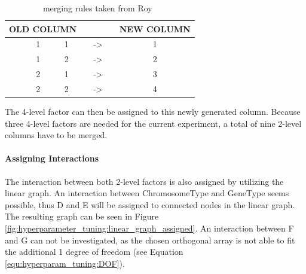 \begin{table}[ht]
	\centering
	\begin{tabular}{ |ccccccc|  }
		\hline
		\multicolumn{3}{|c}{ OLD COLUMN } & & & & NEW COLUMN \\
		\hline
		& 1 & 1 & & -> & & 1\\
		& 1 & 2 & & -> & & 2\\
		& 2 & 1 & & -> & & 3\\
		& 2 & 2 & & -> & & 4\\
		\hline
	\end{tabular}
	\caption{merging rules taken from Roy~\cite{roy_primer_1990}}
	\label{tab:hyperparameter_tuning:merging_rules}
\end{table}

The 4-level factor can then be assigned to this newly generated column. Because three 4-level factors are needed for the current experiment, a total of nine 2-level columns have to be merged.

\paragraph{Assigning Interactions}
The interaction between both 2-level factors is also assigned by utilizing the linear graph. An interaction between ChromosomeType and GeneType seems possible, thus D and E will be assigned to connected nodes in the linear graph. The resulting graph can be seen in Figure \ref{fig:hyperparameter_tuning:linear_graph_assigned}. An interaction between F and G can not be investigated, as the chosen orthogonal array is not able to fit the additional 1 degree of freedom (see Equation \ref{equ:hyperparam_tuning:DOF}).

